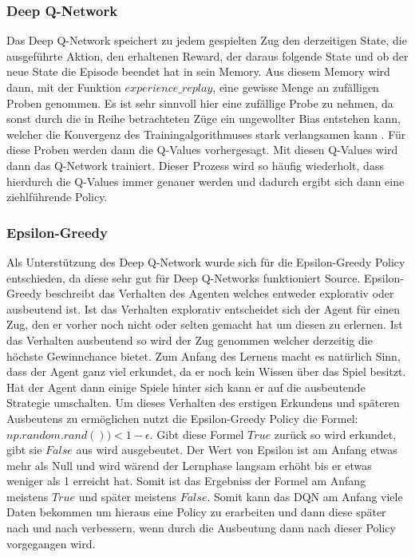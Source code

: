 \subsubsection{Deep Q-Network}
Das Deep Q-Network speichert zu jedem gespielten Zug den derzeitigen State, die ausgeführte Aktion, den erhaltenen Reward, der daraus folgende State und ob der neue State die Episode beendet hat in sein Memory. Aus diesem Memory wird dann, mit der Funktion $experience\_replay$, eine gewisse Menge an zufälligen Proben genommen. Es ist sehr sinnvoll hier eine zufällige Probe zu nehmen, da sonst durch die in Reihe betrachteten Züge ein ungewollter Bias entstehen kann, welcher die Konvergenz des Trainingalgorithmuses stark verlangsamen kann
\cite[Seite 469]{HandsOn2017}.
Für diese Proben werden dann die Q-Values vorhergesagt. Mit diesen Q-Values wird dann das Q-Network trainiert. 
Dieser Prozess wird so häufig wiederholt, dass hierdurch die Q-Values immer genauer  werden und dadurch ergibt sich dann eine ziehlführende Policy.


\subsubsection{Epsilon-Greedy}
Als Unterstützung des Deep Q-Network wurde sich für die Epsilon-Greedy Policy entschieden, da diese sehr gut für Deep Q-Networks funktioniert \colorbox{red!30}{Source}. Epsilon-Greedy beschreibt das Verhalten des Agenten welches entweder explorativ oder ausbeutend ist. Ist das Verhalten explorativ entscheidet sich der Agent für einen Zug, den er vorher noch nicht oder selten gemacht hat um diesen zu erlernen. Ist das Verhalten ausbeutend so wird der Zug genommen welcher derzeitig die höchste Gewinnchance bietet. Zum Anfang des Lernens macht es natürlich Sinn, dass der Agent ganz viel erkundet, da er noch kein Wissen über das Spiel besitzt. Hat der Agent dann einige Spiele hinter sich kann er auf die ausbeutende Strategie umschalten. Um dieses Verhalten des erstigen Erkundens und späteren Ausbeutens zu ermöglichen nutzt die Epsilon-Greedy Policy die Formel: $np.random.rand())<1-\epsilon$. Gibt diese Formel $True$ zurück so wird erkundet, gibt sie $False$ aus wird ausgebeutet. Der Wert von Epsilon ist am Anfang etwas mehr als Null und wird wärend der Lernphase langsam erhöht bis er etwas weniger als 1 erreicht hat. Somit ist das Ergebniss der Formel am Anfang meistens $True$ und später meistens $False$. Somit kann das DQN am Anfang viele Daten bekommen um hieraus eine Policy zu erarbeiten und dann diese später nach und nach verbessern, wenn durch die Ausbeutung dann nach dieser Policy vorgegangen wird.


